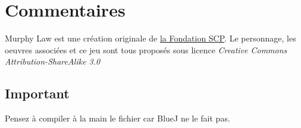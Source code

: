 \section{Commentaires}

Murphy Law est une création originale de \href{http://scp-wiki.wikidot.com/murphy-law-hub}{la Fondation SCP}. Le personnage, les oeuvres associées et ce jeu sont tous proposés sous licence \emph{Creative Commons Attribution-ShareAlike 3.0}

\subsection{Important}

Pensez à compiler à la main le fichier  car BlueJ ne le fait pas.
